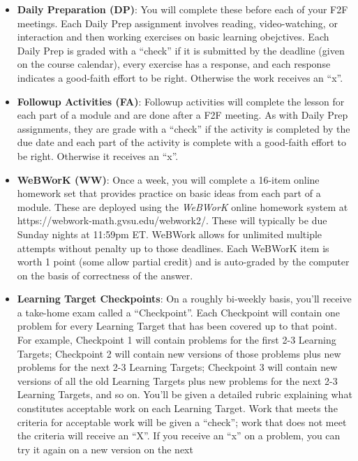 \documentclass[]{article}
\providecommand{\tightlist}{%
  \setlength{\itemsep}{0pt}\setlength{\parskip}{0pt}}
\begin{document}
\begin{itemize}
\tightlist
\item
  \textbf{Daily Preparation (DP)}: You will complete these before each
  of your F2F meetings. Each Daily Prep assignment involves reading,
  video-watching, or interaction and then working exercises on basic
  learning obejctives. Each Daily Prep is graded with a ``check'' if it
  is submitted by the deadline (given on the course calendar), every
  exercise has a response, and each response indicates a good-faith
  effort to be right. Otherwise the work receives an ``x''.
\item
  \textbf{Followup Activities (FA)}: Followup activities will complete
  the lesson for each part of a module and are done after a F2F meeting.
  As with Daily Prep assignments, they are grade with a ``check'' if the
  activity is completed by the due date and each part of the activity is
  complete with a good-faith effort to be right. Otherwise it receives
  an ``x''.\\
\item
  \textbf{WeBWorK (WW)}: Once a week, you will complete a 16-item online
  homework set that provides practice on basic ideas from each part of a
  module. These are deployed using the \emph{WeBWorK} online homework
  system at https://webwork-math.gvsu.edu/webwork2/. These will
  typically be due Sunday nights at 11:59pm ET. WeBWork allows for
  unlimited multiple attempts without penalty up to those deadlines.
  Each WeBWorK item is worth 1 point (some allow partial credit) and is
  auto-graded by the computer on the basis of correctness of the answer.
\item
  \textbf{Learning Target Checkpoints}: On a roughly bi-weekly basis,
  you'll receive a take-home exam called a ``Checkpoint''. Each
  Checkpoint will contain one problem for every Learning Target that has
  been covered up to that point. For example, Checkpoint 1 will contain
  problems for the first 2-3 Learning Targets; Checkpoint 2 will contain
  new versions of those problems plus new problems for the next 2-3
  Learning Targets; Checkpoint 3 will contain new versions of all the
  old Learning Targets plus new problems for the next 2-3 Learning
  Targets, and so on. You'll be given a detailed rubric explaining what
  constitutes acceptable work on each Learning Target. Work that meets
  the criteria for acceptable work will be given a ``check''; work that
  does not meet the criteria will receive an ``X''. If you receive an
  ``x'' on a problem, you can try it again on a new version on the next

\end{itemize}
\end{document}
